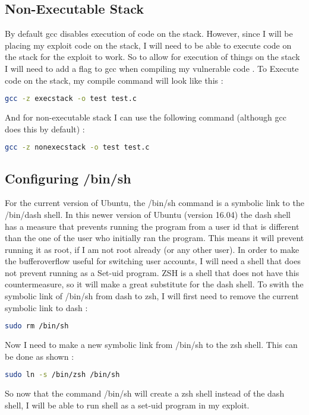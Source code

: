 \documentclass[14pt]{extarticle}
\begin{document}
\subsection{Non-Executable Stack}
By default gcc disables execution of code on the stack. However, since I will be placing my exploit code on the stack, I will need to be able to execute code on the stack for the exploit to work. So to allow for execution of things on the stack I will need to add a flag to gcc when compiling my vulnerable code \cite{seed-bof}.
To Execute code on the stack, my compile command will look like this \cite{seed-bof}:
\begin{lstlisting}[language=bash]
   gcc -z execstack -o test test.c
\end{lstlisting}
And for non-executable stack I can use the following command (although gcc does this by default) \cite{seed-bof}:
\begin{lstlisting}[language=bash]
   gcc -z nonexecstack -o test test.c
\end{lstlisting}

\subsection{Configuring /bin/sh}
For the current version of Ubuntu, the /bin/sh command is a symbolic link to the /bin/dash shell. In this newer version of Ubuntu (version 16.04) the dash shell has a measure that prevents running the program from a user id that is different than the one of the user who initially ran the program. This means it will prevent running it as root, if I am not root already (or any other user). In order to make the bufferoverflow useful for switching user accounts, I will need a shell that does not prevent running as a Set-uid program. ZSH is a shell that does not have this countermeasure, so it will make a great substitute for the dash shell. To swith the symbolic link of /bin/sh from dash to zsh, I will first need to remove the current symbolic link to dash \cite{seed-bof}:
\begin{lstlisting}[language=bash]
  sudo rm /bin/sh
\end{lstlisting}
Now I need to make a new symbolic link from /bin/sh to the zsh shell. This can be done as shown \cite{seed-bof}:
\begin{lstlisting}[language=bash]
  sudo ln -s /bin/zsh /bin/sh
\end{lstlisting}
So now that the command /bin/sh will create a zsh shell instead of the dash shell, I will be able to run shell as a set-uid program in my exploit.
\end{document}
